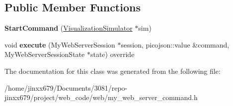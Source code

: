 \subsection*{Public Member Functions}
\begin{DoxyCompactItemize}
\item 
\mbox{\label{classStartCommand_a032600f4a75539fed73a001f6e9385b4}} 
{\bfseries Start\+Command} (\hyperlink{classVisualizationSimulator}{Visualization\+Simulator} $\ast$sim)
\item 
\mbox{\label{classStartCommand_a2747ad8798f5f8cd284bce97994ab8c3}} 
void {\bfseries execute} (My\+Web\+Server\+Session $\ast$session, picojson\+::value \&command, My\+Web\+Server\+Session\+State $\ast$state) override
\end{DoxyCompactItemize}


The documentation for this class was generated from the following file\+:\begin{DoxyCompactItemize}
\item 
/home/jinxx679/\+Documents/3081/repo-\/jinxx679/project/web\+\_\+code/web/my\+\_\+web\+\_\+server\+\_\+command.\+h\end{DoxyCompactItemize}
